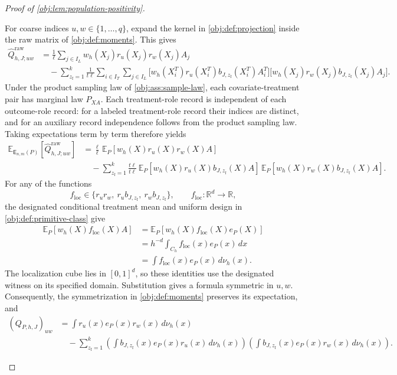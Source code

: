 \documentclass[11pt]{article}
\begin{document}
\begin{proof}[Proof of \cref{obj:lem:population-positivity}]
\begin{enumerate}
For coarse indices \(u,w\in\{1,\ldots,q\}\), expand the kernel in
\cref{obj:def:projection} inside the raw matrix of
\cref{obj:def:moments}. This gives
\[
\begin{aligned}
\widehat Q^{\mathrm{raw}}_{h,J;uw}
&=\frac1\ell\sum_{j\in I_L}
 w_h(X_j)r_u(X_j)r_w(X_j)A_j\\
&\quad-\sum_{z_{\mathrm f}=1}^{k}\frac1{t\ell}
 \sum_{i\in I_T}\sum_{j\in I_L}
 \bigl[w_h(X_i^T)r_u(X_i^T)b_{J,z_{\mathrm f}}(X_i^T)A_i^T\bigr]
 \bigl[w_h(X_j)r_w(X_j)b_{J,z_{\mathrm f}}(X_j)A_j\bigr].
\end{aligned}
\]
Under the product sampling law of \cref{obj:ass:sample-law}, each covariate-treatment pair has marginal law \(P_{XA}\). Each treatment-role record is independent of each outcome-role record: for a labeled treatment-role record their indices are distinct, and for an auxiliary record independence follows from the product sampling law. Taking expectations term by term therefore yields
\[
\begin{aligned}
\mathbb E_{\mathsf E_{n,m}(P)}
 [\widehat Q^{\mathrm{raw}}_{h,J;uw}]
&=\frac{\ell}{\ell}\,
 \mathbb E_P[w_h(X)r_u(X)r_w(X)A]\\
&\quad-\sum_{z_{\mathrm f}=1}^{k}\frac{t\ell}{t\ell}\,
 \mathbb E_P[w_h(X)r_u(X)b_{J,z_{\mathrm f}}(X)A]\,
 \mathbb E_P[w_h(X)r_w(X)b_{J,z_{\mathrm f}}(X)A].
\end{aligned}
\]
For any of the functions
\[
f_{\mathrm{loc}}\in
\{r_ur_w,\ r_ub_{J,z_{\mathrm f}},\ r_wb_{J,z_{\mathrm f}}\},
\qquad
f_{\mathrm{loc}}:\mathbb R^d\longrightarrow\mathbb R,
\]
the designated conditional treatment mean and uniform design in
\cref{obj:def:primitive-class} give
\[
\begin{aligned}
\mathbb E_P[w_h(X)f_{\mathrm{loc}}(X)A]
&=\mathbb E_P[w_h(X)f_{\mathrm{loc}}(X)e_P(X)]\\
&=h^{-d}\int_{C_h}f_{\mathrm{loc}}(x)e_P(x)\,dx\\
&=\int f_{\mathrm{loc}}(x)e_P(x)\,d\nu_h(x).
\end{aligned}
\]
The localization cube lies in \([0,1]^d\), so these identities use the designated witness on its specified domain. Substitution gives a formula symmetric in \(u,w\). Consequently, the symmetrization in \cref{obj:def:moments} preserves its expectation, and
\[
\begin{aligned}
(Q_{P,h,J})_{uw}
&=\int r_u(x)e_P(x)r_w(x)\,d\nu_h(x)\\
&\quad-\sum_{z_{\mathrm f}=1}^{k}
 \left(\int b_{J,z_{\mathrm f}}(x)e_P(x)r_u(x)\,d\nu_h(x)\right)
 \left(\int b_{J,z_{\mathrm f}}(x)e_P(x)r_w(x)\,d\nu_h(x)\right).
\end{aligned}
\]


\end{enumerate}
\end{proof}
\end{document}
